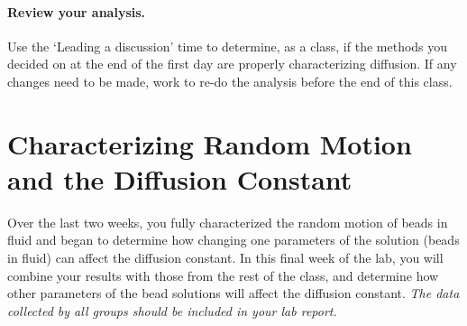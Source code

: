 \paragraph*{Review your analysis.} Use the `Leading a discussion' time to determine, as a class, if the methods you decided on at the end of the first day are properly characterizing diffusion. If any changes need to be made, work to re-do the analysis before the end of this class. 

\section{Characterizing Random Motion and the Diffusion Constant}
Over the last two weeks, you fully characterized the random motion of beads in fluid and began to determine how changing one parameters of the solution (beads in fluid) can affect the diffusion constant.
In this final week of the lab, you will combine your results with those from the rest of the class, and determine how other parameters of the bead solutions will affect the diffusion constant.
\emph{The data collected by all groups should be included in your lab report.}

